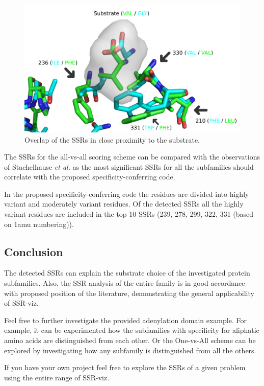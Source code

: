 \documentclass[a4paper,10pt]{article}
\begin{document}
\begin{figure}
  \includegraphics[width=\linewidth]{./figs/positions}
  \caption{Overlap of the SSRs in close proximity to the substrate.}
  \label{fig:positions}
\end{figure}

The SSRs for the all-vs-all scoring scheme can be compared with the observations of Stachelhause \textit{et al.} \cite{stachelhaus_specificity-conferring_1999}
as the most significant SSRs for all the subfamilies should correlate with the proposed specificity-conferring code.

In the proposed specificity-conferring code the residues are divided into highly variant and moderately variant residues.
Of the detected SSRs all the highly variant residues are included in the top 10 SSRs (239, 278, 299, 322, 331 
(based on 1amu numbering)). 

\subsection{Conclusion}

The detected SSRs can explain the substrate choice of the investigated protein subfamilies. Also, the SSR analysis 
of the entire family is in good accordance with proposed position of the literature, demonstrating the general applicability of SSR-viz. 

Feel free to further investigate the provided adenylation domain example. For example, it can be experimented how the subfamilies with specificity for aliphatic
amino acids are distinguished from each other. Or the One-vs-All scheme can be explored by investigating how any subfamily is distinguished from all the others.

If you have your own project feel free to explore the SSRs of a given problem using the entire range of SSR-viz.
\end{document}
